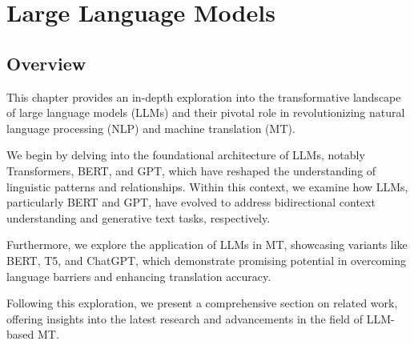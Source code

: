 \chapter{Large Language Models}
\pagestyle{fancy}
\pagestyle{fancy}\chead{} \pagestyle{fancy}\rhead{}
\pagestyle{fancy} 
\pagestyle{fancy}\cfoot{} \pagestyle{fancy}\rfoot{\thepage}
\section{Overview}\label{start4}
This chapter provides an in-depth exploration into the transformative landscape of large language models (LLMs) and their pivotal role in revolutionizing natural language processing (NLP) and machine translation (MT). 

We begin by delving into the foundational architecture of LLMs, notably Transformers, BERT, and GPT, which have reshaped the understanding of linguistic patterns and relationships. 
Within this context, we examine how LLMs, particularly BERT and GPT, have evolved to address bidirectional context understanding and generative text tasks, respectively. 

Furthermore, we explore the application of LLMs in MT, showcasing variants like BERT, T5, and ChatGPT, which demonstrate promising potential in overcoming language barriers and enhancing translation accuracy. 

Following this exploration, we present a comprehensive section on related work, offering insights into the latest research and advancements in the field of LLM-based MT.


